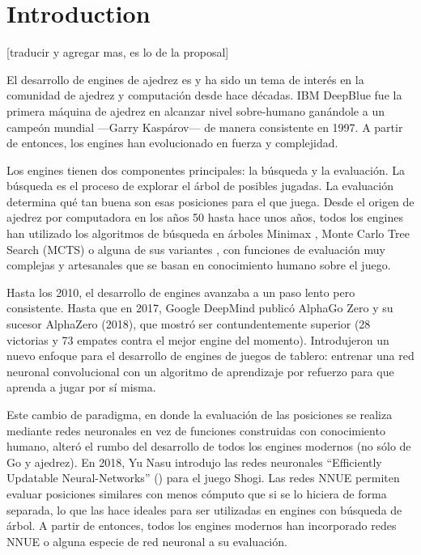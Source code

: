 \section{Introduction}



[traducir y agregar mas, es lo de la proposal]

El desarrollo de engines de ajedrez es y ha sido un tema de interés en la comunidad de ajedrez y computación desde hace décadas. IBM DeepBlue \cite{deepblue:2002} fue la primera máquina de ajedrez en alcanzar nivel sobre-humano ganándole a un campeón mundial ---Garry Kaspárov--- de manera consistente en 1997. A partir de entonces, los engines han evolucionado en fuerza y complejidad.

Los engines tienen dos componentes principales: la búsqueda y la evaluación. La búsqueda es el proceso de explorar el árbol de posibles jugadas. La evaluación determina qué tan buena son esas posiciones para el que juega. Desde el origen de ajedrez por computadora en los años 50 hasta hace unos años, todos los engines han utilizado los algoritmos de búsqueda en árboles Minimax \cite{minimax-survey:1995}, Monte Carlo Tree Search \cite{mcts-survey:2012} (MCTS) o alguna de sus variantes \cite{tree-search-methods:2014,mcts-modifications:2022}, con funciones de evaluación muy complejas y artesanales que se basan en conocimiento humano sobre el juego.

Hasta los 2010, el desarrollo de engines avanzaba a un paso lento pero consistente. Hasta que en 2017, Google DeepMind publicó AlphaGo Zero \cite{alphagozero:2017} y su sucesor AlphaZero \cite{alphazero:2017,alphazero:2018} (2018), que mostró ser contundentemente superior (28 victorias y 73 empates contra el mejor engine del momento). Introdujeron un nuevo enfoque para el desarrollo de engines de juegos de tablero: entrenar una red neuronal convolucional con un algoritmo de aprendizaje por refuerzo para que aprenda a jugar por sí misma.

Este cambio de paradigma, en donde la evaluación de las posiciones se realiza mediante redes neuronales en vez de funciones construidas con conocimiento humano, alteró el rumbo del desarrollo de todos los engines modernos (no sólo de Go y ajedrez). En 2018, Yu Nasu introdujo las redes neuronales ``Efficiently Updatable Neural-Networks''  \cite{nnue:2018} () para el juego Shogi. Las redes NNUE permiten evaluar posiciones similares con menos cómputo que si se lo hiciera de forma separada, lo que las hace ideales para ser utilizadas en engines con búsqueda de árbol. A partir de entonces, todos los engines modernos han incorporado redes NNUE o alguna especie de red neuronal a su evaluación.

